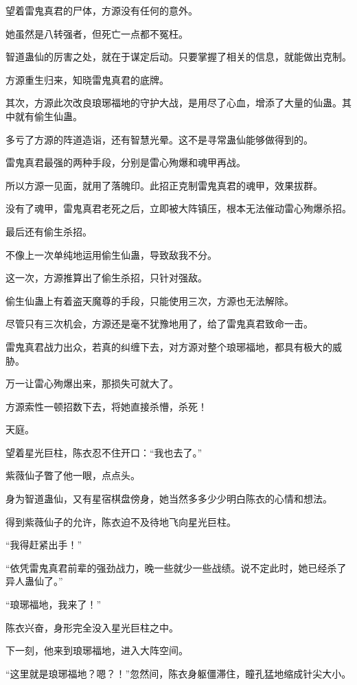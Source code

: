 \begin{this_body}
望着雷鬼真君的尸体，方源没有任何的意外。

她虽然是八转强者，但死亡一点都不冤枉。

智道蛊仙的厉害之处，就在于谋定后动。只要掌握了相关的信息，就能做出克制。

方源重生归来，知晓雷鬼真君的底牌。

其次，方源此次改良琅琊福地的守护大战，是用尽了心血，增添了大量的仙蛊。其中就有偷生仙蛊。

多亏了方源的阵道造诣，还有智慧光晕。这不是寻常蛊仙能够做得到的。

雷鬼真君最强的两种手段，分别是雷心殉爆和魂甲再战。

所以方源一见面，就用了落魄印。此招正克制雷鬼真君的魂甲，效果拔群。

没有了魂甲，雷鬼真君老死之后，立即被大阵镇压，根本无法催动雷心殉爆杀招。

最后还有偷生杀招。

不像上一次单纯地运用偷生仙蛊，导致敌我不分。

这一次，方源推算出了偷生杀招，只针对强敌。

偷生仙蛊上有着盗天魔尊的手段，只能使用三次，方源也无法解除。

尽管只有三次机会，方源还是毫不犹豫地用了，给了雷鬼真君致命一击。

雷鬼真君战力出众，若真的纠缠下去，对方源对整个琅琊福地，都具有极大的威胁。

万一让雷心殉爆出来，那损失可就大了。

方源索性一顿招数下去，将她直接杀懵，杀死！

天庭。

望着星光巨柱，陈衣忍不住开口：“我也去了。”

紫薇仙子瞥了他一眼，点点头。

身为智道蛊仙，又有星宿棋盘傍身，她当然多多少少明白陈衣的心情和想法。

得到紫薇仙子的允许，陈衣迫不及待地飞向星光巨柱。

“我得赶紧出手！”

“依凭雷鬼真君前辈的强劲战力，晚一些就少一些战绩。说不定此时，她已经杀了异人蛊仙了。”

“琅琊福地，我来了！”

陈衣兴奋，身形完全没入星光巨柱之中。

下一刻，他来到琅琊福地，进入大阵空间。

“这里就是琅琊福地？嗯？！”忽然间，陈衣身躯僵滞住，瞳孔猛地缩成针尖大小。


\end{this_body}
